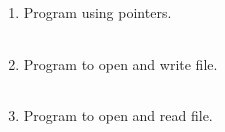 \documentclass{exam}
\begin{document}
\begin{enumerate}
   \item  Program  using pointers.

   \begin{myTableStyle}
   \begin{center} \begin{tabular}{ |m{14cm}| } \hline
              \\ \hline
    \end{tabular} \end{center}
\end{myTableStyle}
  \pagebreak\pagebreak\pagebreak

   \item  Program  to open and write file.

   \begin{myTableStyle}
   \begin{center} \begin{tabular}{ |m{14cm}| } \hline
              \\ \hline
    \end{tabular} \end{center}
\end{myTableStyle}
  \pagebreak\pagebreak\pagebreak

   \item  Program  to open and read file.

   \begin{myTableStyle}
   \begin{center} \begin{tabular}{ |m{14cm}| } \hline
              \\ \hline
    \end{tabular} \end{center}
\end{myTableStyle}

  \end{enumerate}
\end{document}
